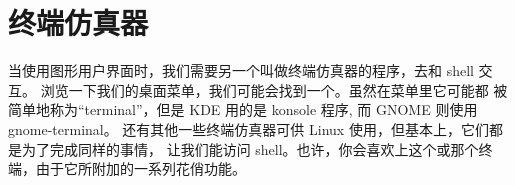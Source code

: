 \section{终端仿真器} %
\label{sec:终端仿真器}

当使用图形用户界面时，我们需要另一个叫做终端仿真器的程序，去和 shell 交互。 浏览一下我们的桌面菜单，我们可能会找到一个。虽然在菜单里它可能都 被简单地称为“terminal”，但是 KDE 用的是 konsole 程序, 而 GNOME 则使用 gnome-terminal。 还有其他一些终端仿真器可供 Linux 使用，但基本上，它们都是为了完成同样的事情， 让我们能访问 shell。也许，你会喜欢上这个或那个终端，由于它所附加的一系列花俏功能。


